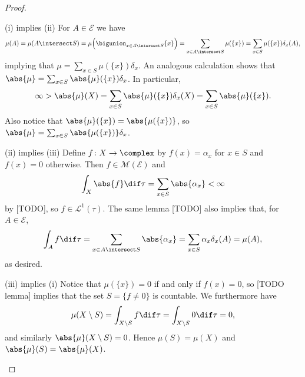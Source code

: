 \documentclass[article, a4paper, 11pt, oneside]{memoir}
\numberwithin{equation}{chapter}
\newcommand{\calE}{\mathcal{E}}
\newcommand{\calM}{\mathcal{M}}
\newcommand{\calL}{\mathcal{L}}
\begin{document}
\begin{proof}
\begin{proofsec}
    \item[(i) implies (ii)]
    For $A \in \calE$ we have
    \begin{equation*}
        \mu(A)
            = \mu(A \intersect S)
            = \mu \Bigl( \bigunion_{x \in A \intersect S} \{x\} \Bigr)
            = \sum_{x \in A \intersect S} \mu(\{x\})
            = \sum_{x \in S} \mu(\{x\}) \delta_x(A),
    \end{equation*}
    implying that $\mu = \sum_{x \in S} \mu(\{x\}) \delta_x$. An analogous calculation shows that $\abs{\mu} = \sum_{x \in S} \abs{\mu}(\{x\}) \delta_x$. In particular,
    \begin{equation*}
        \infty
            > \abs{\mu}(X)
            = \sum_{x \in S} \abs{\mu}(\{x\}) \delta_x(X)
            = \sum_{x \in S} \abs{\mu}(\{x\}).
    \end{equation*}
    Also notice that $\abs{\mu}(\{x\}) = \abs{\mu(\{x\})}$, so $\abs{\mu} = \sum_{x \in S} \abs{\mu(\{x\})} \delta_x$.

    \item[(ii) implies (iii)]
    Define $f \colon X \to \complex$ by $f(x) = \alpha_x$ for $x \in S$ and $f(x) = 0$ otherwise. Then $f \in \calM(\calE)$ and
    \begin{equation*}
        \int_X \abs{f} \dif\tau
            = \sum_{x \in S} \abs{\alpha_x}
            < \infty
    \end{equation*}
    by [TODO], so $f \in \calL^1(\tau)$. The same lemma [TODO] also implies that, for $A \in \calE$,
    \begin{equation*}
        \int_A f \dif\tau
            = \sum_{x \in A \intersect S} \abs{\alpha_x}
            = \sum_{x \in S} \alpha_x \delta_x(A)
            = \mu(A),
    \end{equation*}
    as desired.

    \item[(iii) implies (i)]
    Notice that $\mu(\{x\}) = 0$ if and only if $f(x) = 0$, so [TODO lemma] implies that the set $S = \{ f \neq 0 \}$ is countable. We furthermore have
    \begin{equation*}
        \mu(X \setminus S)
            = \int_{X \setminus S} f \dif\tau
            = \int_{X \setminus S} 0 \dif\tau
            = 0,
    \end{equation*}
    and similarly $\abs{\mu}(X \setminus S) = 0$. Hence $\mu(S) = \mu(X)$ and $\abs{\mu}(S) = \abs{\mu}(X)$.
\end{proofsec}
\end{proof}
\end{document}
